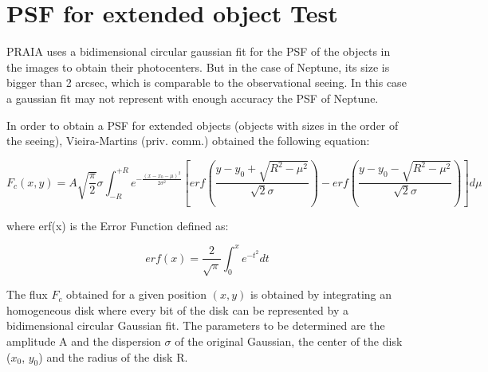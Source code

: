 \documentclass[12pt,a4paper]{report}
\begin{document}

\section*{PSF for extended object Test}

PRAIA uses a bidimensional circular gaussian fit for the PSF of the objects in the images to obtain their photocenters. But in the case of Neptune, its size is bigger than 2 arcsec, which is comparable to the observational seeing. In this case a gaussian fit may not represent with enough accuracy the PSF of Neptune.

In order to obtain a PSF for extended objects (objects with sizes in the order of the seeing), Vieira-Martins (priv. comm.) obtained the following equation:

\begin{equation}
F_{c}(x,y) = A\sqrt{\frac{\pi}{2}}\sigma \int_{-R}^{+R} e^{-\frac{(x-x_{0}-\mu)^2}{2\sigma^2}} \left[ erf \left( \frac{y-y_{0}+\sqrt{R^2 - \mu^2}}{\sqrt{2}\sigma} \right) - erf \left( \frac{y-y_{0}-\sqrt{R^2 - \mu^2}}{\sqrt{2}\sigma} \right) \right] d\mu
\end{equation}

where erf(x) is the Error Function defined as:

\begin{equation}
erf(x) = \frac{2}{\sqrt{\pi}} \int_{0}^{x} e^{-t^2} dt
\end{equation}

The flux $F_c$ obtained for a given position $(x,y)$ is obtained by integrating an homogeneous disk where every bit of the disk can be represented by a bidimensional circular Gaussian fit. The parameters to be determined are the amplitude A and the dispersion $\sigma$ of the original Gaussian, the center of the disk ($x_0$, $y_0$) and the radius of the disk R.
\end{document}
